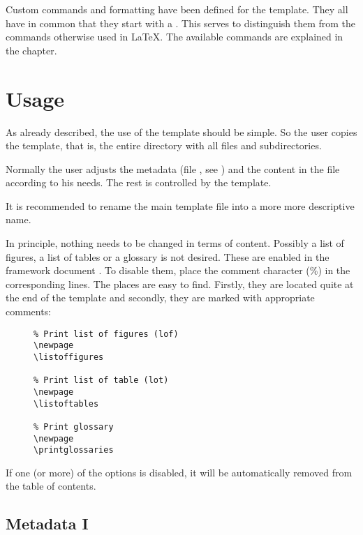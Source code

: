 Custom commands and formatting have been defined for the template. They all
have in common that they start with a .
This serves to distinguish them from the commands otherwise used in \LaTeX{}.
The available commands are explained in the  chapter.

\section{Usage}

As already described, the use of the template should be simple. So the user
copies the template, that is, the entire directory with all files and
subdirectories.
\bigbreak

Normally the user adjusts the metadata (file ,
see ) and the content in the file
 according to his needs. The rest is controlled
by the template.
\bigbreak

It is recommended to rename the main template file 
into a more more descriptive name.


In principle, nothing needs to be changed in terms of content. Possibly a
list of figures, a list of tables or a glossary is not desired. These are
enabled in the framework document . To disable
them, place the comment character (\%) in the corresponding lines. The places
are easy to find. Firstly, they are located quite at the end of the template
and secondly, they are marked with appropriate comments:

\begin{figure}[H]
    \scriptsize
    \centering
    \begin{BVerbatim}
\newpage
\listoffigures

\newpage
\listoftables

\newpage
\printglossaries
    \end{BVerbatim}
\end{figure}

If one (or more) of the options is disabled, it will be automatically removed
from the table of contents.

\subsection{Metadata I}
\label{subsec:Metadata-I}

